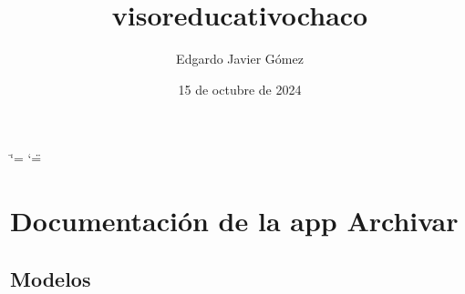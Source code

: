 \documentclass[letterpaper,10pt,spanish]{sphinxmanual}
\title{visoreducativochaco}
\date{15 de octubre de 2024}
\author{Edgardo Javier Gómez}
\begin{document}
\ifdefined\shorthandoff
  \ifnum\catcode`\=\string=\active\shorthandoff{=}\fi
  \ifnum\catcode`\"=\active{}\fi
\fi

\pagestyle{empty}
\sphinxmaketitle
\pagestyle{plain}
\sphinxtableofcontents
\pagestyle{normal}
\label{\detokenize{index::doc}}


\sphinxstepscope


\chapter{Documentación de la app Archivar}
\label{\detokenize{archivar:documentacion-de-la-app-archivar}}\label{\detokenize{archivar::doc}}

\section{Modelos}
\label{\detokenize{archivar:modelos}}
\end{document}
